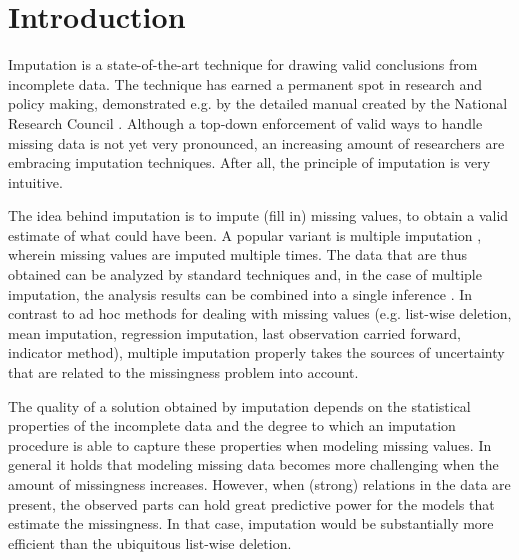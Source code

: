\documentclass[bimj,fleqn]{w-art}
\begin{document}



\section{Introduction}

Imputation is a state-of-the-art technique for drawing valid conclusions from incomplete data. The technique has earned a permanent spot in research and policy making, demonstrated e.g. by the detailed manual created by the National Research Council \citep*{little2012prevention}. Although a top-down enforcement of valid ways to handle missing data is not yet very pronounced, an increasing amount of researchers are embracing imputation techniques. After all, the principle of imputation is very intuitive.

The idea behind imputation is to impute (fill in) missing values, to obtain a valid estimate of what could have been. A popular variant is multiple imputation \citep{rubi76}, wherein missing values are imputed multiple times. The data that are thus obtained can be analyzed by standard techniques and, in the case of multiple imputation, the analysis results can be combined into a single inference \citep[using Rubin's rules][]{rubi87}. In contrast to ad hoc methods for dealing with missing values (e.g. list-wise deletion, mean imputation, regression imputation, last observation carried forward, indicator method), multiple imputation properly takes the sources of uncertainty that are related to the missingness problem into account. 

The quality of a solution obtained by imputation depends on the statistical properties of the incomplete data and the degree to which an imputation procedure is able to capture these properties when modeling missing values. In general it holds that modeling missing data becomes more challenging when the amount of missingness increases. However, when (strong) relations in the data are present, the observed parts can hold great predictive power for the models that estimate the missingness. In that case,  imputation would be substantially more efficient than the ubiquitous list-wise deletion.
\end{document}
